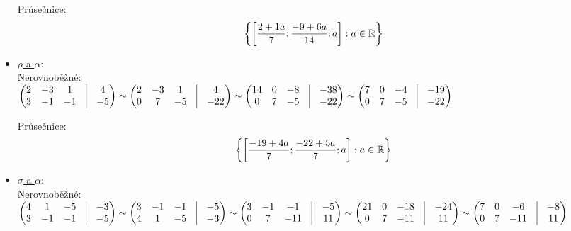 \begin{itemize}
		Průsečnice:
		 $$ 
		 \left\{{\left[{\frac{2+1 a}{7}; \frac{-9+6 a}{14}; a}\right]:a \in \mathbb{R}}\right\} 
		   $$ 
	\item \underline{$\rho$ a $\alpha$}: \\
		Nerovnoběžné:\\
		 $ \begin{pmatrix}
			 2 &-3 &1 &\vline& 4 \\ 
			 3 &-1 &-1 &\vline& -5 \\ 
		 \end{pmatrix}
		 \sim
		 \begin{pmatrix}
			 2 &-3 &1 &\vline& 4 \\ 
			 0 &7 &-5 &\vline& -22 \\ 
		 \end{pmatrix}
		 \sim
		 \begin{pmatrix}
			 14 &0 &-8 &\vline& -38 \\ 
			 0 &7 &-5 &\vline& -22 \\ 
		 \end{pmatrix}
		 \sim
		 \begin{pmatrix}
			 7 &0 &-4 &\vline& -19 \\ 
			 0 &7 &-5 &\vline& -22 \\ 
		 \end{pmatrix}
		 $


		Průsečnice:
		$$ 
		 \left\{{\left[{\frac{-19+4 a}{7}; \frac{-22+5 a}{7}; a}\right]:a \in \mathbb{R}}\right\} 
		  $$ 
	\item \underline{$\sigma$ a $\alpha$}: \\
		Nerovnoběžné:\\
		 $  \begin{pmatrix}
			 4 &1 &-5 &\vline& -3 \\ 
			 3 &-1 &-1 &\vline& -5 \\ 
		 \end{pmatrix}
		 \sim
		 \begin{pmatrix}
			 3 &-1 &-1 &\vline& -5 \\ 
			 4 &1 &-5 &\vline& -3 \\ 
		 \end{pmatrix}
		 \sim
		 \begin{pmatrix}
			 3 &-1 &-1 &\vline& -5 \\ 
			 0 &7 &-11 &\vline& 11 \\ 
		 \end{pmatrix}
		 \sim
		 \begin{pmatrix}
			 21 &0 &-18 &\vline& -24 \\ 
			 0 &7 &-11 &\vline& 11 \\ 
		 \end{pmatrix}
		 \sim
		 \begin{pmatrix}
			 7 &0 &-6 &\vline& -8 \\ 
			 0 &7 &-11 &\vline& 11 \\ 
		 \end{pmatrix}
		 $



\end{itemize}
